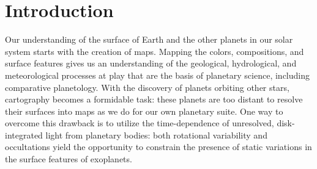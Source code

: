 \documentclass[modern]{aastex61}
\begin{document}
%
\section{Introduction}
\label{sec:intro}

Our understanding of the surface of Earth and the other planets in our solar
system starts with the creation of maps.  Mapping the colors, compositions, and
surface features gives us an understanding of the geological, hydrological,
and meteorological processes at play that are the basis of planetary science,
including comparative planetology.
%
With the discovery of planets orbiting other
stars, cartography becomes a formidable task: these planets are too distant to
resolve their surfaces into maps as we do for our own planetary suite.  One way
to overcome this drawback is to utilize the time-dependence of unresolved,
disk-integrated light from planetary bodies:  both rotational variability
\citep{Russell1906,Lacis1972,Cowan2008,OakleyCash2009}
and occultations \citep{Williams2006,Rauscher2007} yield the opportunity to constrain
the presence of static variations in the surface features of exoplanets.
\end{document}
